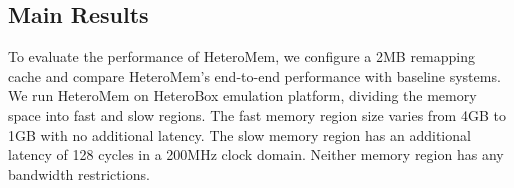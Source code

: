 \subsection{Main Results} 
To evaluate the performance of HeteroMem, we configure a 2MB remapping cache and compare HeteroMem's end-to-end performance with baseline systems. We run HeteroMem on HeteroBox emulation platform, dividing the memory space into fast and slow regions. The fast memory region size varies from 4GB to 1GB with no additional latency. The slow memory region has an additional latency of 128 cycles in a 200MHz clock domain. Neither memory region has any bandwidth restrictions.

